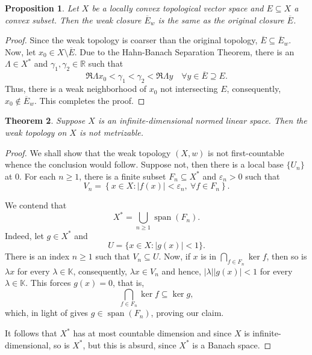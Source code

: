 \documentclass[12pt]{article}
\theoremstyle{thmstyle}
\newtheorem{theorem}{Theorem}[section]
\newtheorem{proposition}[theorem]{Proposition}
\theoremstyle{defstyle}
\newcommand{\R}{\mathbb{R}}
\newcommand{\bbC}{\mathbb{C}}
\newcommand{\K}{\mathbb{K}} %
\renewcommand{\ge}{\geqslant}
\begin{document}
\begin{proposition}
    Let $X$ be a locally convex topological vector space and $E\subseteq X$ a convex subset. Then the weak closure $\overline E_w$ is the same as the original closure $\overline E$.
\end{proposition}
\begin{proof}
    Since the weak topology is coarser than the original topology, $\overline E\subseteq\overline E_w$. Now, let $x_0\in X\setminus\overline E$. Due to the Hahn-Banach Separation Theorem, there is an $\Lambda\in X^\ast$ and $\gamma_1,\gamma_2\in\R$ such that 
    \begin{equation*}
        \Re \Lambda x_0 < \gamma_1 < \gamma_2 < \Re\Lambda y\quad\forall y\in\overline E\supseteq E.
    \end{equation*}
    Thus, there is a weak neighborhood of $x_0$ not intersecting $E$, consequently, $x_0\notin\overline E_w$. This completes the proof.
\end{proof}


\begin{theorem}
    Suppose $X$ is an infinite-dimensional normed linear space. Then the weak topology on $X$ is not metrizable.
\end{theorem}
\begin{proof}
    We shall show that the weak topology $(X, w)$ is not first-countable whence the conclusion would follow. Suppose not, then there is a local base $\{U_n\}$ at $0$. For each $n\ge 1$, there is a finite subset $F_n\subseteq X^\ast$ and $\varepsilon_n > 0$ such that 
    \begin{equation*}
        V_n = \left\{x\in X\colon |f(x)| < \varepsilon_n,~\forall f\in F_n\right\}.
    \end{equation*}

    We contend that 
    \begin{equation*}
        X^\ast = \bigcup_{n\ge 1} \operatorname{span}(F_n).
    \end{equation*}
    Indeed, let $g\in X^\ast$ and 
    \begin{equation*}
        U = \{x\in X\colon |g(x)| < 1\}.
    \end{equation*}
    There is an index $n\ge 1$ such that $V_n\subseteq U$. Now, if $x$ is in $\bigcap\limits_{f\in F_n}\ker f$, then so is $\lambda x$ for every $\lambda\in\K$, consequently, $\lambda x\in V_n$ and hence, $|\lambda||g(x)| < 1$ for every $\lambda\in\K$. This forces $g(x) = 0$, that is, 
    \begin{equation*}
        \bigcap_{f\in F_n}\ker f\subseteq\ker g,
    \end{equation*}
    which, in light of  gives $g\in\operatorname{span}(F_n)$, proving our claim.

    It follows that $X^\ast$ has at most countable dimension and since $X$ is infinite-dimensional, so is $X^\ast$, but this is absurd, since $X^\ast$ is a Banach space.
\end{proof}
\end{document}
